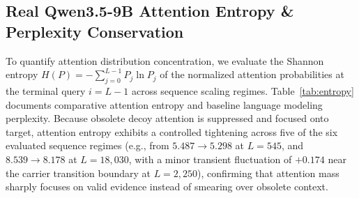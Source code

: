 \documentclass[11pt,a4paper]{article}
\theoremstyle{definition}
\begin{document}
\begin{table}[htbp]
\centering
\small
{}
\caption{\textbf{Autoregressive single-step decode latency across scaling contexts on dual Tesla T4 GPUs.} End-to-end forward latency stays around $\approx 276\,\text{ms}$ at $L=18,030$ (with a minor PCIe sync fluctuation at $L=2,250$), confirming zero algorithmic scaling slowdown up to 18,030 tokens. Isolated per-layer operator overhead reflects $+1.8$ to $+2.1\,\mu\text{s}$ for epilogue angle fusion outside the attention kernel.}
\label{tab:scaling}
\end{table}

\subsection{Real Qwen3.5-9B Attention Entropy \& Perplexity Conservation}
To quantify attention distribution concentration, we evaluate the Shannon entropy $H(P) = -\sum_{j=0}^{L-1} P_j \ln P_j$ of the normalized attention probabilities at the terminal query $i = L-1$ across sequence scaling regimes. Table~\ref{tab:entropy} documents comparative attention entropy and baseline language modeling perplexity. Because obsolete decoy attention is suppressed and focused onto target, attention entropy exhibits a controlled tightening across five of the six evaluated sequence regimes (e.g., from $5.487 \to 5.298$ at $L=545$, and $8.539 \to 8.178$ at $L=18,030$, with a minor transient fluctuation of $+0.174$ near the carrier transition boundary at $L=2,250$), confirming that attention mass sharply focuses on valid evidence instead of smearing over obsolete context.
\end{document}
